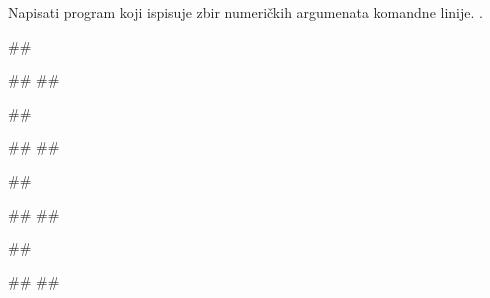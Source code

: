 \begin{Exercise}[label=p2.6_01] 
Napisati program koji ispisuje zbir numeričkih argumenata komandne linije. 
.

\begin{miditest}
\begin{upotreba}{1}
##

#\naslovIzlaz#
##
\end{upotreba}
\end{miditest}
\begin{miditest}
\begin{upotreba}{2}
##

#\naslovIzlaz#
##
\end{upotreba}
\end{miditest}

\begin{miditest}
\begin{upotreba}{3}
##

#\naslovIzlaz#
##
\end{upotreba}
\end{miditest}
\begin{miditest}
\begin{upotreba}{4}
##

#\naslovIzlaz#
##
\end{upotreba}
\end{miditest}
\end{Exercise}
\ifresenja
\begin{Answer}[ref=p2.6_01]
\end{Answer}
 \fi

